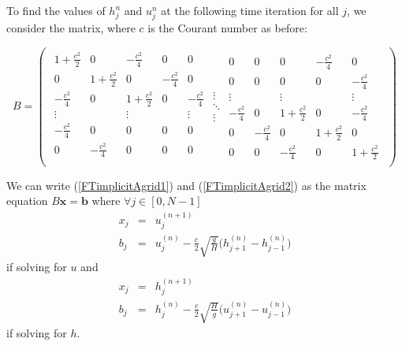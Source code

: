 \documentclass[a4paper, 10.5pt, notitlepage]{article}
\begin{document}
To find the values of $h_{j}^{n}$ and $u_{j}^{n}$ at the following time iteration for all $j$, we consider the matrix, where $c$ is the Courant number as before:

\[
B = \left (
\begin{array}{ccc}
\begin{array}{ccccc}
1 + \frac{c^{2}}{2} & 0 & -\frac{c^{2}}{4} & 0 & 0\\
0& 1 + \frac{c^{2}}{2} & 0 & -\frac{c^{2}}{4} & 0\\
-\frac{c^{2}}{4} & 0& 1 + \frac{c^{2}}{2} & 0 & -\frac{c^{2}}{4}\\
\vdots & & \vdots & & \vdots\\
- \frac{c^{2}}{4} & 0 & 0 & 0 & 0\\
0 & - \frac{c^{2}}{4} & 0 & 0 & 0\\
\end{array}
\begin{array}{c}
\vdots\\ 
\ddots\\
\vdots
\end{array}
\begin{array}{ccccc}
0 & 0 & 0 & - \frac{c^{2}}{4} & 0\\
0 & 0 & 0 & 0 & - \frac{c^{2}}{4}\\
\vdots & & \vdots & & \vdots\\
-\frac{c^{2}}{4}& 0 & 1 + \frac{c^{2}}{2} & 0 & -\frac{c^{2}}{4} \\
0 & -\frac{c^{2}}{4} & 0 & 1 + \frac{c^{2}}{2} & 0\\
0 & 0 & -\frac{c^{2}}{4}& 0 & 1 + \frac{c^{2}}{2}
\end{array}
\end{array}
\right )
\]

We can write (\ref{FTimplicitAgrid1}) and (\ref{FTimplicitAgrid2}) as the matrix equation $B \mathbf{x} = \mathbf{b}$ where $\forall j \in [0, N-1]$
\begin{eqnarray}
x_{j} & = & u_{j}^{(n+1)}\\
b_{j} & = & u_{j}^{(n)} - \frac{c}{2}\sqrt{\frac{g}{H}}\bigg(h_{j+1}^{(n)} - h_{j-1}^{(n)}\bigg) 
\end{eqnarray}
if solving for $u$ and 
\begin{eqnarray}
x_{j} & = & h_{j}^{(n+1)}\\
b_{j} & = & h_{j}^{(n)} - \frac{c}{2}\sqrt{\frac{H}{g}}\bigg(u_{j+1}^{(n)} - u_{j-1}^{(n)}\bigg)
\end{eqnarray}
if solving for $h$.
\end{document}
